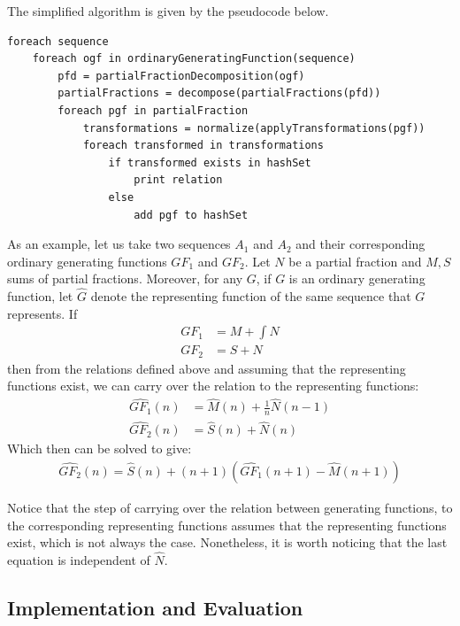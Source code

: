 The simplified algorithm is given by the pseudocode below.
\begin{lstlisting}[style=myScalastyle]
foreach sequence
    foreach ogf in ordinaryGeneratingFunction(sequence)
        pfd = partialFractionDecomposition(ogf)
        partialFractions = decompose(partialFractions(pfd))
        foreach pgf in partialFraction
            transformations = normalize(applyTransformations(pgf))
            foreach transformed in transformations
                if transformed exists in hashSet
                    print relation
                else
                    add pgf to hashSet
\end{lstlisting}

As an example, let us take two sequences $A_1$ and $A_2$ and their corresponding ordinary generating functions $GF_1$
 and $GF_2$. Let $N$ be a partial fraction and $M,S$ sums of partial fractions. Moreover, for any $G$, if $G$ is an
 ordinary generating function, let $\hat{G}$ denote the representing function of the same sequence that $G$ represents. If
\begin{align}
GF_1 &= M + \int N \\
GF_2 &= S + N
\end{align}
then from the relations defined above and assuming that the representing functions exist, we can carry over the
relation to the representing functions:
\begin{align}
\hat{GF_1}(n) &= \hat{M}(n) + \frac{1}{n}\hat{N}(n-1) \\
\hat{GF_2}(n) &= \hat{S}(n) + \hat{N}(n)
\end{align}
Which then can be solved to give:
\begin{align}
\hat{GF_2}(n) = \hat{S}(n) + (n+1)(\hat{GF_1}(n+1) - \hat{M}(n+1)) \label{eq:transform}
\end{align}

Notice that the step of carrying over the relation between generating functions, to the corresponding representing
functions assumes that the representing functions exist, which is not always the case. Nonetheless, it is worth
noticing that the last equation is independent of $\hat{N}$.

\subsection{Implementation and Evaluation}

